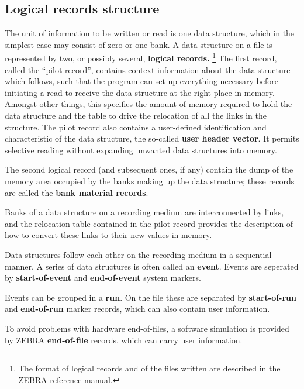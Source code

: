 \subsection{Logical records structure}
\par The unit of information to be written or read is one data structure,
which in the simplest case may consist of zero or one bank.
A data structure on a file is represented by two,
or possibly several,
{\bf logical records.}
\footnote{The format of logical records and of the files written
are described in the ZEBRA reference manual.}
The first record, called the ``pilot record'',
contains context information about the data structure which follows,
such that the program can set up everything necessary before
initiating a read to receive the data structure
at the right place in memory.
Amongst other things,
this specifies the amount of memory required to hold
the data structure and the table to drive the relocation
of all the links in the structure.
The pilot record also contains a user-defined identification
and characteristic of the data structure, the so-called
{\bf user header vector}.
It permits selective reading without expanding unwanted
data structures into memory.
\par The second logical record (and subsequent ones, if any)
contain the dump of the memory area occupied by the banks
making up the data structure;
these records are called the {\bf bank material records}.
\par Banks of a data structure on a recording medium
are interconnected by links,
and the relocation table contained in the pilot record provides
the description of how to convert these links to their new values
in memory.
\par Data structures follow each other on the recording medium
in a sequential manner.
A series of data structures is often called an {\bf event}.
Events are seperated by {\bf start-of-event} and
{\bf end-of-event} system markers.
 
Events can be grouped in a {\bf run}. On the file these are
separated by {\bf start-of-run} and {\bf end-of-run}
marker records, which can also contain user information.
 
To avoid problems with hardware end-of-files,
a software simulation is provided by ZEBRA {\bf end-of-file}
records, which can carry user information.
